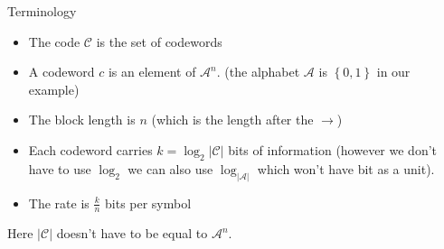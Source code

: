 \begin{parag}{Terminology}
    \begin{itemize}
        \item The code $\mathcal{C}$ is the set of codewords 
        \item A codeword $c$ is an element of $\mathcal{A}^n$. (the alphabet $\mathcal{A}$ is $\left\{0, 1\right\}$ in our example)
        \item The block length is $n$  (which is the length after the $\to$)
        \item Each codeword carries $k = \log_2\left|\mathcal{C}\right|$ bits of information (however we don't have to use $\log_2$ we can also use $\log_{\left|\mathcal{A}\right|}$ which won't have bit as a unit).
        \item The rate is $\frac{k}{n}$ bits per symbol
    \end{itemize}
    
   \begin{framedremark}
       Here $\left|\mathcal{C}\right|$ doesn't have to be equal to $\mathcal{A}^n$.
   \end{framedremark}
    
\end{parag}
